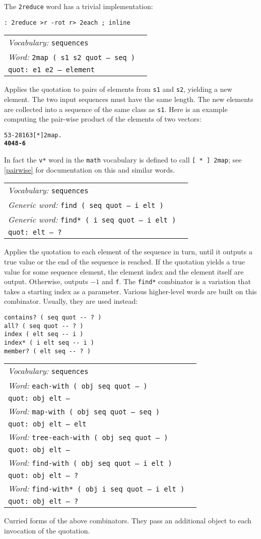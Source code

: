 \documentclass{book}
\newcommand{\tto}{\symbol{123}}
\newcommand{\ttc}{\symbol{125}}
\newcommand{\vocabulary}[1]{\emph{Vocabulary:} \texttt{#1}&\\}
\newcommand{\ordinaryword}[2]{\index{\texttt{#1}}\emph{Word:} \texttt{#2}&\\}
\newcommand{\genericword}[2]{\index{\texttt{#1}}\emph{Generic word:} \texttt{#2}&\\}
\newcommand{\wordtable}[1]{


\begin{tabularx}{12cm}{lX}
\hline
#1
\hline
\end{tabularx}

}
\begin{document}
The \verb|2reduce| word has a trivial implementation:
\begin{verbatim}
: 2reduce >r -rot r> 2each ; inline
\end{verbatim}

\wordtable{
\vocabulary{sequences}
\ordinaryword{2map}{2map ( s1 s2 quot -- seq )}
\texttt{quot:~e1 e2 -- element}\\
}
Applies the quotation to pairs of elements from \texttt{s1} and \texttt{s2}, yielding a new element. The two input sequences must have the same length. The new elements are collected into a sequence of the same class as \texttt{s1}. Here is an example computing the pair-wise product of the elements of two vectors:
\begin{alltt}
  \tto 5 3 -2 \ttc \tto 8 16 3 \ttc [ * ] 2map .
\textbf{\tto 40 48 -6 \ttc}
\end{alltt}

In fact the \verb|v*| word in the \verb|math| vocabulary is defined to call \verb|[ * ] 2map|; see \ref{pairwise} for documentation on this and similar words.

\wordtable{
\vocabulary{sequences}
\genericword{find}{find ( seq quot -- i elt )}
\genericword{find*}{find*~( i seq quot -- i elt )}
\texttt{quot:~elt -- ?}\\
}
Applies the quotation to each element of the sequence in turn, until it outputs a true value or the end of the sequence is reached. If the quotation yields a true value for some sequence element, the element index and the element itself are output. Otherwise, outputs $-1$ and \verb|f|. The \verb|find*| combinator is a variation that takes a starting index as a parameter. Various higher-level words are built on this combinator. Usually, they are used instead:
\begin{verbatim}
contains? ( seq quot -- ? )
all? ( seq quot -- ? )
index ( elt seq -- i )
index* ( i elt seq -- i )
member? ( elt seq -- ? )
\end{verbatim}

\wordtable{
\vocabulary{sequences}
\ordinaryword{each-with}{each-with ( obj seq quot -- )}
\texttt{quot:~obj elt --}\\
\ordinaryword{map-with}{map-with ( obj seq quot -- seq )}
\texttt{quot:~obj elt -- elt}\\
\ordinaryword{tree-each-with}{tree-each-with ( obj seq quot -- )}
\texttt{quot:~obj elt --}\\
\ordinaryword{find-with}{find-with ( obj seq quot -- i elt )}
\texttt{quot:~obj elt -- ?}\\
\ordinaryword{find-with*}{find-with*~( obj i seq quot -- i elt )}
\texttt{quot:~obj elt -- ?}\\
}
Curried forms of the above combinators. They pass an additional object to each invocation of the quotation.
\end{document}
